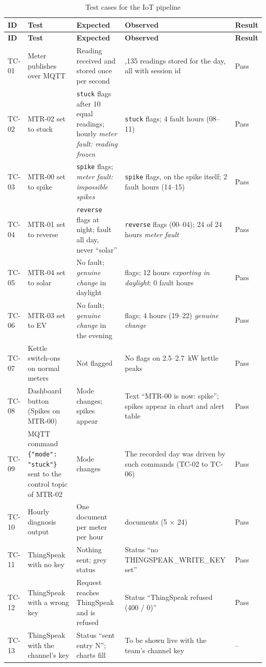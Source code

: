 \documentclass[12pt,a4paper,oneside]{report}
\begin{document}
\begin{longtable}{>{\raggedright\arraybackslash}p{1.15cm} >{\raggedright\arraybackslash}p{3.25cm} >{\raggedright\arraybackslash}p{4.0cm} >{\raggedright\arraybackslash}p{4.0cm} >{\raggedright\arraybackslash}p{1.15cm}}
\caption{Test cases for the IoT pipeline}\label{tab:tc}\\
\toprule
\textbf{ID} & \textbf{Test} & \textbf{Expected} & \textbf{Observed} & \textbf{Result}\\
\midrule
\endfirsthead
\toprule
\textbf{ID} & \textbf{Test} & \textbf{Expected} & \textbf{Observed} & \textbf{Result}\\
\midrule
\endhead
TC-01 & Meter publishes over MQTT & Reading received and stored once per second & 7,135 readings stored for the day, all with session id & Pass \\
TC-02 & MTR-02 set to stuck & \texttt{stuck} flags after 10 equal readings; hourly \emph{meter fault: reading frozen} & 230 \texttt{stuck} flags; 4 fault hours (08--11) & Pass \\
TC-03 & MTR-00 set to spike & \texttt{spike} flags; \emph{meter fault: impossible spikes} & 4 \texttt{spike} flags, on the spike itself; 2 fault hours (14--15) & Pass \\
TC-04 & MTR-01 set to reverse & \texttt{reverse} flags at night; fault all day, never ``solar'' & 220 \texttt{reverse} flags (00--04); 24 of 24 hours \emph{meter fault} & Pass \\
TC-05 & MTR-04 set to solar & No fault; \emph{genuine change} in daylight & 0 flags; 12 hours \emph{exporting in daylight}; 0 fault hours & Pass \\
TC-06 & MTR-03 set to EV & No fault; \emph{genuine change} in the evening & 0 flags; 4 hours (19--22) \emph{genuine change} & Pass \\
TC-07 & Kettle switch-ons on normal meters & Not flagged & No flags on 2.5--2.7~kW kettle peaks & Pass \\
TC-08 & Dashboard button (Spikes on MTR-00) & Mode changes; spikes appear & Text ``MTR-00 is now: spike''; spikes appear in chart and alert table & Pass \\
TC-09 & MQTT command \texttt{\{"mode":} \texttt{"stuck"\}} sent to the control topic of MTR-02 & Mode changes & The recorded day was driven by such commands (TC-02 to TC-06) & Pass \\
TC-10 & Hourly diagnosis output & One document per meter per hour & 120 documents (5 $\times$ 24) & Pass \\
TC-11 & ThingSpeak with no key & Nothing sent; grey status & Status ``no THINGSPEAK\_WRITE\_KEY set'' & Pass \\
TC-12 & ThingSpeak with a wrong key & Request reaches ThingSpeak and is refused & Status ``ThingSpeak refused (400 / 0)'' & Pass \\
TC-13 & ThingSpeak with the channel's key & Status ``sent entry N''; charts fill & To be shown live with the team's channel key & -- \\
\bottomrule
\end{longtable}
\end{document}
